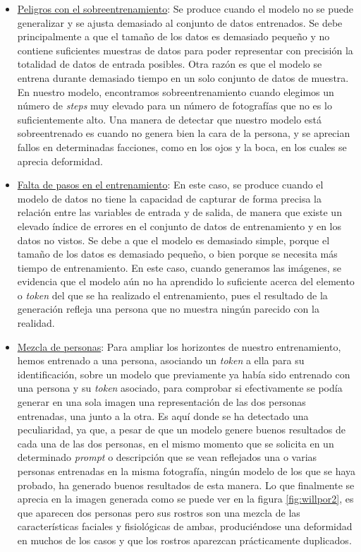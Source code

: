 \begin{itemize}
	\item \underline{Peligros con el sobreentrenamiento}: Se produce cuando el modelo no se puede generalizar y se ajusta demasiado al conjunto de datos entrenados. Se debe principalmente a que el tamaño de los datos es demasiado pequeño y no contiene suficientes muestras de datos para poder representar con precisión la totalidad de datos de entrada posibles. Otra razón es que el modelo se entrena durante demasiado tiempo en un solo conjunto de datos de muestra. En nuestro modelo, encontramos sobreentrenamiento cuando elegimos un número de \textit{steps} muy elevado para un número de fotografías que no es lo suficientemente alto. Una manera de detectar que nuestro modelo está sobreentrenado es cuando no genera bien la cara de la persona, y se aprecian fallos en determinadas facciones, como en los ojos y la boca, en los cuales se aprecia deformidad.\\

	\item \underline{Falta de pasos en el entrenamiento}: En este caso, se produce cuando el modelo de datos no tiene la capacidad de capturar de forma precisa la relación entre las variables de entrada y de salida, de manera que existe un elevado índice de errores en el conjunto de datos de entrenamiento y en los datos no vistos. Se debe a que el modelo es demasiado simple, porque el tamaño de los datos es demasiado pequeño, o bien porque se necesita más tiempo de entrenamiento. En este caso, cuando generamos las imágenes, se evidencia que el modelo aún no ha aprendido lo suficiente acerca del elemento o \textit{token} del que se ha realizado el entrenamiento, pues el resultado de la generación refleja una persona que no muestra ningún parecido con la realidad.\\


	\item \underline{Mezcla de personas}: Para ampliar los horizontes de nuestro entrenamiento, hemos entrenado a una persona, asociando un \textit{token} a ella para su identificación, sobre un modelo que previamente ya había sido entrenado con una persona y su \textit{token} asociado, para comprobar si efectivamente se podía generar en una sola imagen una representación de las dos personas entrenadas, una junto a la otra. Es aquí donde se ha detectado una peculiaridad, ya que, a pesar de que un modelo genere buenos resultados de cada una de las dos personas, en el mismo momento que se solicita en un determinado \textit{prompt} o descripción que se vean reflejados una o varias personas entrenadas en la misma fotografía, ningún modelo de los que se haya probado, ha generado buenos resultados de esta manera. Lo que finalmente se aprecia en la imagen generada como se puede ver en la figura \ref{fig:willpor2}, es que aparecen dos personas pero sus rostros son una mezcla de las características faciales y fisiológicas de ambas, produciéndose una deformidad en muchos de los casos y que los rostros aparezcan prácticamente duplicados.\\



\end{itemize}

